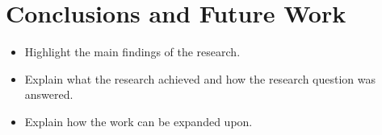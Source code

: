 \section{Conclusions and Future Work}
\label{sec: conclusion-and-future-work}

\begin{itemize}
    \item Highlight the main findings of the research.
    \item Explain what the research achieved and how the research question was answered.
    \item Explain how the work can be expanded upon.
\end{itemize}